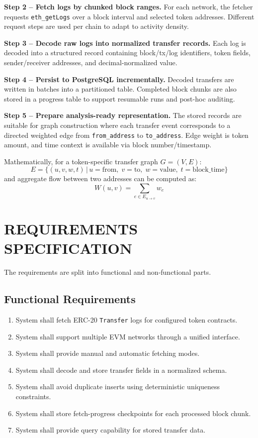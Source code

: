 \documentclass[a4paper,12pt]{report}
\begin{document}
\textbf{Step 2 -- Fetch logs by chunked block ranges.}
For each network, the fetcher requests \texttt{eth\_getLogs} over a block interval and selected token
addresses. Different request steps are used per chain to adapt to activity density.

\textbf{Step 3 -- Decode raw logs into normalized transfer records.}
Each log is decoded into a structured record containing block/tx/log identifiers, token fields,
sender/receiver addresses, and decimal-normalized value.

\textbf{Step 4 -- Persist to PostgreSQL incrementally.}
Decoded transfers are written in batches into a partitioned table. Completed block chunks are also
stored in a progress table to support resumable runs and post-hoc auditing.

\textbf{Step 5 -- Prepare analysis-ready representation.}
The stored records are suitable for graph construction where each transfer event corresponds to a
directed weighted edge from \texttt{from\_address} to \texttt{to\_address}. Edge weight is token amount, and
time context is available via block number/timestamp.

Mathematically, for a token-specific transfer graph $G=(V,E)$:
$$
E = \{(u,v,w,t)\,|\,u=\text{from},\;v=\text{to},\;w=\text{value},\;t=\text{block\_time}\}
$$
and aggregate flow between two addresses can be computed as:
$$
W(u,v)=\sum_{e\in E_{u\rightarrow v}} w_e
$$


\chapter{REQUIREMENTS SPECIFICATION}
The requirements are split into functional and non-functional parts.

\section*{Functional Requirements}
\begin{enumerate}
\item System shall fetch ERC-20 \texttt{Transfer} logs for configured token contracts.
\item System shall support multiple EVM networks through a unified interface.
\item System shall provide manual and automatic fetching modes.
\item System shall decode and store transfer fields in a normalized schema.
\item System shall avoid duplicate inserts using deterministic uniqueness constraints.
\item System shall store fetch-progress checkpoints for each processed block chunk.
\item System shall provide query capability for stored transfer data.
\end{enumerate}
\end{document}

